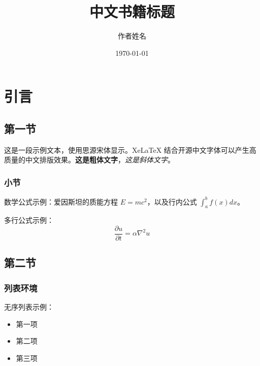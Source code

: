 \documentclass[fontsize=12pt, paper=a4, twoside, openright, DIV=calc]{scrbook}
\title{中文书籍标题}
\author{作者姓名}
\date{\today}
\theoremstyle{break}
\begin{document}
\maketitle

\frontmatter


\tableofcontents

\mainmatter

\chapter{引言}

\section{第一节}

这是一段示例文本，使用思源宋体显示。XeLaTeX 结合开源中文字体可以产生高质量的中文排版效果。\textbf{这是粗体文字}，\textit{这是斜体文字}。

\subsection{小节}

数学公式示例：爱因斯坦的质能方程 $E = mc^2$，以及行内公式 $\int_a^b f(x) dx$。

多行公式示例：
\begin{equation}
\frac{\partial u}{\partial t} = \alpha \nabla^2 u
\end{equation}

\section{第二节}

\subsection{列表环境}

无序列表示例：
\begin{itemize}
\item 第一项
\item 第二项
\item 第三项
\end{itemize}
\end{document}
